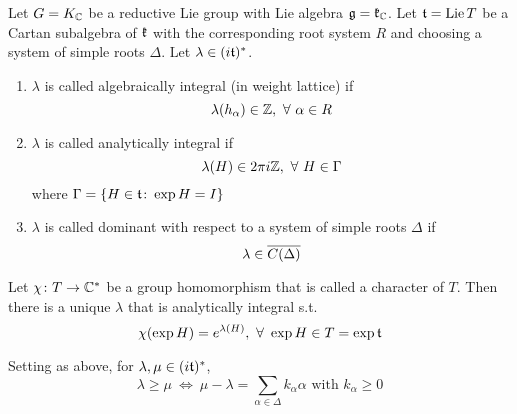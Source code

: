 \documentclass[a4paper,12pt]{article}
\begin{document}
	\begin{defn}
		Let $G=K_{\mathbb{C}}$ be a reductive Lie group with Lie algebra $\mathfrak{g} = \mathfrak{k}_{\mathbb{C}}$. Let $\mathfrak{t} = \operatorname{Lie} T$ be a Cartan subalgebra of $\mathfrak{k}$ with the corresponding root system $R$ and choosing a system of simple roots $\Delta$. Let $\lambda \in (i\mathfrak{t})^{*}$.
		\begin{enumerate}
			\item $\lambda$ is called algebraically integral (in weight lattice) if
			\begin{equation*}
				\lambda(h_{\alpha}) \in \mathbb{Z},~\forall~ \alpha \in R
			\end{equation*}
			\item  $\lambda$ is called analytically integral if
			\begin{equation*}
				\lambda(H) \in 2\pi i\mathbb{Z},~\forall~H \in \Gamma 
			\end{equation*}
			where $\Gamma = \left\{H \in \mathfrak{t} \colon \exp H = I\right\}$
			\item $\lambda$ is called dominant with respect to a system of simple roots $\Delta$ if
			\begin{equation*}
				\lambda \in \overline{C(\Delta)}
			\end{equation*}
		\end{enumerate}
	\end{defn}
	\begin{rem}
		Let $\chi \colon T \rightarrow \mathbb{C}^{*}$ be a group homomorphism that is called a character of $T$. Then there is a unique $\lambda$ that is analytically integral  s.t.
		\begin{equation*}
			\chi(\exp H) = e^{\lambda(H)},~\forall~\exp H \in T = \exp \mathfrak{t}
		\end{equation*}
	\end{rem}

	\begin{defn}
		Setting as above, for $\lambda,\mu \in (i\mathfrak{t})^*$,
		\begin{equation*}
			\lambda \geqslant \mu ~\Leftrightarrow~ \mu - \lambda = \sum_{\alpha \in \Delta}k_{\alpha} \alpha \text{ with }k_{\alpha} \geqslant 0
		\end{equation*}
	\end{defn}
\end{document}
